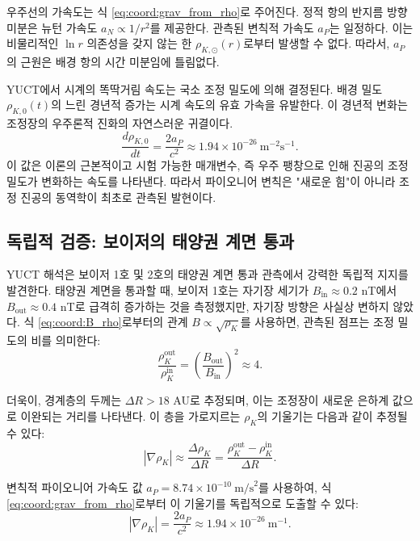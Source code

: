 \documentclass[11pt,a4paper]{article}
\theoremstyle{remark}
\begin{document}
	우주선의 가속도는 식 \eqref{eq:coord:grav_from_rho}로 주어진다. 정적 항의 반지름 방향 미분은 뉴턴 가속도 \(a_N \propto 1/r^2\)를 제공한다. 관측된 변칙적 가속도 \(a_P\)는 일정하다. 이는 비물리적인 \(\ln r\) 의존성을 갖지 않는 한 \(\rho_{K,\odot}(r)\)로부터 발생할 수 없다. 따라서, \(a_P\)의 근원은 배경 항의 시간 미분임에 틀림없다.
	
	YUCT에서 시계의 똑딱거림 속도는 국소 조정 밀도에 의해 결정된다. 배경 밀도 \(\rho_{K,0}(t)\)의 느린 경년적 증가는 시계 속도의 유효 가속을 유발한다. 이 경년적 변화는 조정장의 우주론적 진화의 자연스러운 귀결이다.
	\begin{equation}
		\frac{d\rho_{K,0}}{dt} = \frac{2a_P}{c^2} \approx 1.94 \times 10^{-26}\ \text{m}^{-2}\text{s}^{-1}.
		\label{eq:coord:rho_dot}
	\end{equation}
	이 값은 이론의 근본적이고 시험 가능한 매개변수, 즉 우주 팽창으로 인해 진공의 조정 밀도가 변화하는 속도를 나타낸다. 따라서 파이오니어 변칙은 "새로운 힘"이 아니라 조정 진공의 동역학이 최초로 관측된 발현이다.
	
	\subsection{독립적 검증: 보이저의 태양권 계면 통과}
	\label{subsec:coord:voyager}
	
	YUCT 해석은 보이저 1호 및 2호의 태양권 계면 통과 관측에서 강력한 독립적 지지를 발견한다. 태양권 계면을 통과할 때, 보이저 1호는 자기장 세기가 \(B_{\text{in}} \approx 0.2\) nT에서 \(B_{\text{out}} \approx 0.4\) nT로 급격히 증가하는 것을 측정했지만, 자기장 방향은 사실상 변하지 않았다. 식 \eqref{eq:coord:B_rho}로부터의 관계 \(B \propto \sqrt{\rho_K}\)를 사용하면, 관측된 점프는 조정 밀도의 비를 의미한다:
	\begin{equation}
		\frac{\rho_K^{\text{out}}}{\rho_K^{\text{in}}} = \left( \frac{B_{\text{out}}}{B_{\text{in}}} \right)^2 \approx 4.
		\label{eq:coord:rho_ratio_voyager}
	\end{equation}
	
	더욱이, 경계층의 두께는 \(\Delta R > 18\) AU로 추정되며, 이는 조정장이 새로운 은하계 값으로 이완되는 거리를 나타낸다. 이 층을 가로지르는 \(\rho_K\)의 기울기는 다음과 같이 추정될 수 있다:
	\begin{equation}
		|\nabla \rho_K| \approx \frac{\Delta \rho_K}{\Delta R} = \frac{\rho_K^{\text{out}} - \rho_K^{\text{in}}}{\Delta R}.
		\label{eq:coord:gradient_estimate}
	\end{equation}
	
	변칙적 파이오니어 가속도 값 \(a_P = 8.74 \times 10^{-10}\ \text{m/s}^2\)를 사용하여, 식 \eqref{eq:coord:grav_from_rho}로부터 이 기울기를 독립적으로 도출할 수 있다:
	\begin{equation}
		|\nabla \rho_K| = \frac{2a_P}{c^2} \approx 1.94 \times 10^{-26}\ \text{m}^{-1}.
		\label{eq:coord:gradient_pioneer}
	\end{equation}
	
\end{document}

